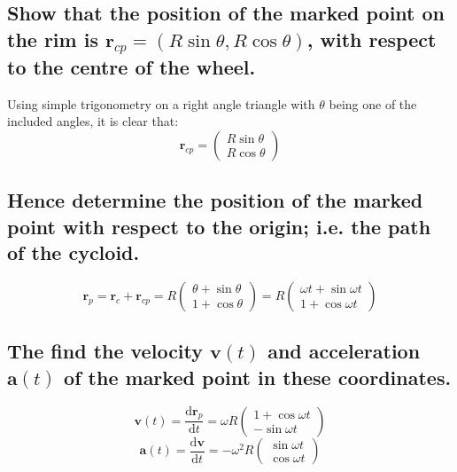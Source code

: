 \documentclass[a4paper]{scrartcl}
\begin{document}
\subsection{Show that the position of the marked point on the rim is \(\mathbf{r}_{cp} = (R \sin \theta, R \cos \theta)\), with respect to the centre of the wheel.}
\begin{center}
\end{center}
Using simple trigonometry on a right angle triangle with \(\theta\) being one of the included angles, it is clear that:
\[\mathbf{r}_{cp} = \begin{pmatrix} R \sin \theta \\  R \cos \theta \end{pmatrix}\]

\subsection{Hence determine the position of the marked point with respect to the origin; i.e. the path of the cycloid.}
\[\mathbf{r}_{p} = \mathbf{r}_{c} + \mathbf{r}_{cp} = R \begin{pmatrix} \theta + \sin \theta \\  1 + \cos \theta \end{pmatrix} = R \begin{pmatrix} \omega t + \sin \omega t \\  1 + \cos \omega t \end{pmatrix}\]

\subsection{The find the velocity \(\mathbf{v}(t)\) and acceleration \(\mathbf{a}(t)\) of the marked point in these coordinates.}
\[\mathbf{v}(t) = \frac{\mathrm{d}\mathbf{r}_p}{\mathrm{d}t} = \omega R \begin{pmatrix} 1 + \cos \omega t \\ - \sin \omega t \end{pmatrix}\]
\[\mathbf{a}(t) = \frac{\mathrm{d}\mathbf{v}}{\mathrm{d}t} = -\omega^2 R \begin{pmatrix} \sin \omega t \\ \cos \omega t \end{pmatrix}\]
\end{document}
